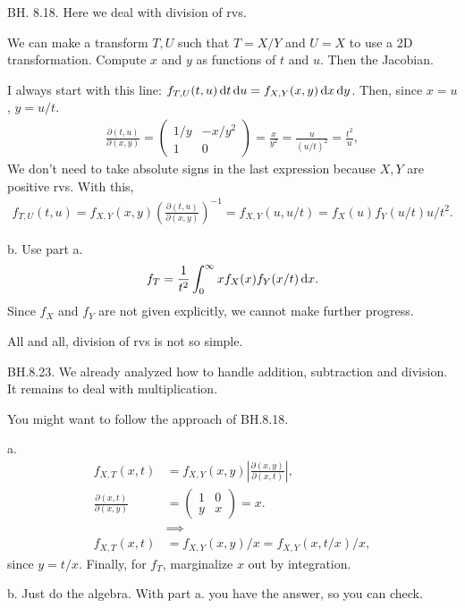 \setcounter{theorem}{17}

\begin{exercise}
BH. 8.18. Here we deal with division of rvs.
\begin{hint} We can make a transform $T, U$ such that $T=X/Y$ and $U=X$  to use a 2D transformation. Compute $x$ and $y$ as functions of $t$ and $u$. Then the Jacobian.
\end{hint}
\begin{solution}
I always start with this line: $f_{T,U}(t,u) \,\textrm{d}t \,\textrm{d}u = f_{X,Y}(x,y) \,\textrm{d}x \,\textrm{d}y$.
Then, since $x=u$, $y=u/t$.
\begin{align*}
\frac{\partial (t, u)}{\partial (x,y)} =
  \begin{pmatrix}
1/y & -x/y^{2} \\
    1 & 0
  \end{pmatrix} = \frac{x}{y^{2}} = \frac{u}{(u/t)^{2}} = \frac{t^{2}}{u},
\end{align*}
We don't need to take absolute signs in the last expression because $X, Y$ are positive rvs.
With this,
\begin{align*}
  f_{T,U}(t,u) = f_{X,Y}(x,y) \left(\frac{\partial (t, u)}{\partial (x,y)}\right)^{-1} = f_{X,Y}(u,u/t) = f_X(u)f_Y(u/t) u/t^{2}.
\end{align*}

b. Use part a.
\begin{align*}
f_{T} = \frac 1{t^2} \int_0^{\infty} x f_X(x) f_Y(x/t) \,\textrm{d}x.
\end{align*}
Since $f_X$ and $f_Y$ are not given explicitly, we cannot make further progress.

All and all, division of rvs is not so simple.
\end{solution}
\end{exercise}


\setcounter{theorem}{22}
\begin{exercise}
BH.8.23. We already analyzed how to handle addition, subtraction and division. It remains to deal with multiplication.
\begin{hint}
You might want to follow the approach of BH.8.18.
\end{hint}
\begin{solution}
a.
\begin{align*}
f_{X,T}(x,t) &= f_{X,Y}(x,y) |\frac{\partial (x,y)}{\partial (x, t)}|, \\
\frac{\partial (x,t)}{\partial (x,y)} &=
  \begin{pmatrix}
    1 & 0 \\
y & x
  \end{pmatrix} = x. \\
&\implies \\
f_{X,T}(x,t) &= f_{X,Y}(x,y)/x= f_{X,Y}(x,t/x)/x,
\end{align*}
since $y=t/x$. Finally, for $f_T$, marginalize $x$ out by integration.

b. Just do the algebra. With part a. you have the answer, so you can check.
\end{solution}
\end{exercise}

